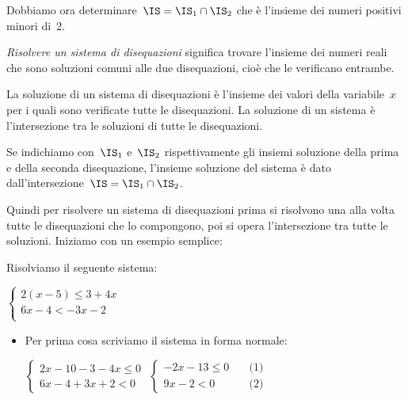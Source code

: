 Dobbiamo ora determinare~$\IS=\IS_{1}\cap\IS_{2}$ che è l'insieme
dei numeri positivi minori di~2.

 \begin{esempio}

\emph{Risolvere un sistema di disequazioni} significa trovare
l'insieme dei numeri reali che sono soluzioni comuni
alle due disequazioni, cioè che le verificano entrambe.

La soluzione di un sistema di disequazioni è l'insieme dei valori della
variabile~$x$ per i quali sono verificate tutte le disequazioni.
La soluzione di un sistema è l'intersezione tra le soluzioni di tutte le
disequazioni.

Se indichiamo con~$\IS_{1}$ e~$\IS_{2}$
rispettivamente gli insiemi soluzione della prima e della seconda
disequazione, l'insieme soluzione del sistema è dato
dall'intersezione~$\IS=\IS_{1}\cap\IS_{2}$.

Quindi per risolvere un sistema di disequazioni prima si risolvono una alla
volta tutte le disequazioni che lo compongono, poi si opera l'intersezione
tra tutte le soluzioni. Iniziamo con un esempio semplice:

Risolviamo il seguente sistema:

$\left\{\begin{array}{l}
  2 (x -5) \le 3 + 4 x \\
  6 x -4 < -3 x -2 \\
\end{array}\right.$

\begin{itemize} [noitemsep]
 \item Per prima cosa scriviamo il sistema in forma normale:

$\left\{\begin{array}{l}
  2 x -10 -3 - 4 x \le 0 \\
  6 x -4 +3 x +2 < 0
\end{array}\right.$
$\left\{\begin{array}{ll}
  -2 x -13 \le 0 & \quad \mbox{(1)} \\
   9 x -2 < 0 & \quad \mbox{(2)}
\end{array}\right.$


\end{itemize}
\end{esempio}

